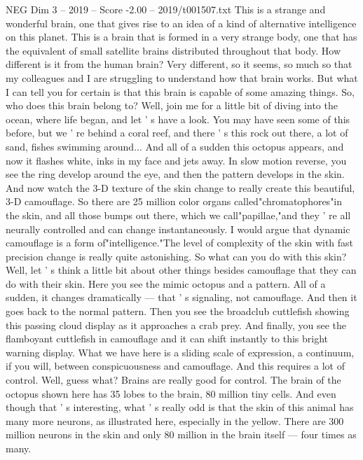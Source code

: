 \begin{textsample}{NEG Dim 3 – 2019 – Score -2.00 – 2019/t001507.txt}  \label{ex:f3_neg_076}
This is a strange and wonderful brain, one that gives rise to an idea of a kind of alternative intelligence on this planet.
This is a brain that is formed in a very strange body, one that has the equivalent of small satellite brains distributed throughout that body.
How different is it from the human brain?
Very different, so it seems, so much so that my colleagues and I are struggling to understand how that brain works.
But what I can tell you for certain is that this brain is capable of some amazing things.
So, who does this brain belong to?
Well, join me for a little bit of diving into the ocean, where life began, and let ' s have a look.
You may have seen some of this before, but we ' re behind a coral reef, and there ' s this rock out there, a lot of sand, fishes swimming around...
And all of a sudden this octopus appears, and now it flashes white, inks in my face and jets away.
In slow motion reverse, you see the ring develop around the eye, and then the pattern develops in the skin.
And now watch the 3-D texture of the skin change to really create this beautiful, 3-D camouflage.
So there are 25 million color organs called"chromatophores"in the skin, and all those bumps out there, which we call"papillae,"and they ' re all neurally controlled and can change instantaneously.
I would argue that dynamic camouflage is a form of"intelligence."The level of complexity of the skin with fast precision change is really quite astonishing.
So what can you do with this skin?
Well, let ' s think a little bit about other things besides camouflage that they can do with their skin.
Here you see the mimic octopus and a pattern.
All of a sudden, it changes dramatically — that ' s signaling, not camouflage.
And then it goes back to the normal pattern.
Then you see the broadclub cuttlefish showing this passing cloud display as it approaches a crab prey.
And finally, you see the flamboyant cuttlefish in camouflage and it can shift instantly to this bright warning display.
What we have here is a sliding scale of expression, a continuum, if you will, between conspicuousness and camouflage.
And this requires a lot of control.
Well, guess what?
Brains are really good for control.
The brain of the octopus shown here has 35 lobes to the brain, 80 million tiny cells.
And even though that ' s interesting, what ' s really odd is that the skin of this animal has many more neurons, as illustrated here, especially in the yellow.
There are 300 million neurons in the skin and only 80 million in the brain itself — four times as many.

\end{textsample}

